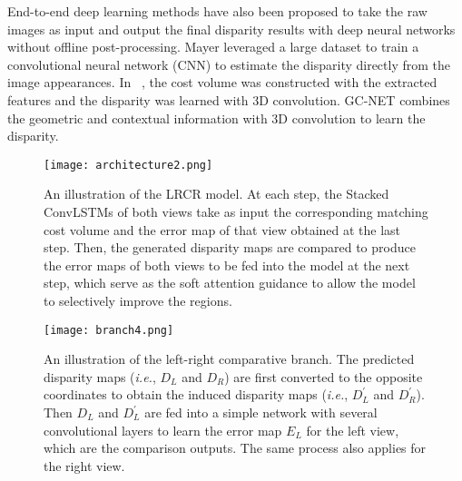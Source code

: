 \documentclass[10pt,twocolumn,letterpaper]{article}
\begin{document}
End-to-end deep learning methods have also been proposed to take the raw images as input and output the final disparity results with deep neural networks without offline post-processing.  Mayer \etal \cite{mayer2016large} leveraged a large dataset to train a convolutional neural network (CNN) to estimate the disparity directly from the image appearances. In ~\cite{mayer2016large}, the cost volume was constructed with the extracted features and the disparity was learned with 3D convolution. GC-NET \cite{kendall2017end} combines the geometric and contextual information with 3D convolution to learn the disparity.
\begin{figure*}
	\begin{minipage}[htbp]{11.1cm}
			\vspace{-0cm}
			\centering
		\texttt{[image: architecture2.png]}
			\vspace{-0.3cm}
		\caption{\small An illustration of the LRCR model. At each step, the Stacked ConvLSTMs of both views take as  input the corresponding matching cost volume and the error map of that view obtained at the last step. Then, the generated disparity maps are compared to produce the error maps of both views to be fed into the model at the next step, which serve as the soft attention guidance to allow the model to selectively improve the regions.}
		\label{fig:archi}
	
			\vspace{-0.5cm}
		\end{minipage}
		\hspace{0.1cm}
	\begin{minipage}[htbp]{6cm}
			\centering
		\texttt{[image: branch4.png]}
		\caption{ \small An illustration of the left-right comparative branch. The predicted disparity maps (\emph{i.e.}, $D_{L}$ and $D_{R}$) are first converted to the opposite coordinates to obtain the induced disparity maps (\emph{i.e.}, $D_{L}^{\prime}$ and $D_{R}^{\prime}$). Then $D_{L}$ and $D_{L}^{\prime}$ are fed into a simple network with several convolutional layers to learn the error map $E_{L}$ for the left view, which are the comparison outputs. The same process also applies for the right view.}
		\label{fig:branch}
		\vspace{-0.5cm}
	\end{minipage}

\end{figure*}
\end{document}
